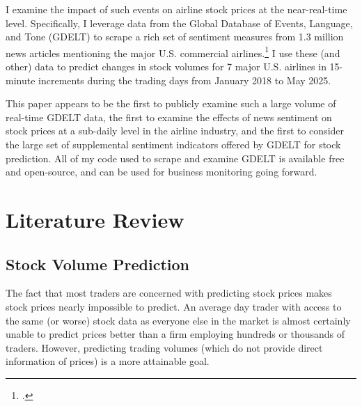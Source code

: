 \documentclass[12pt]{article}
\begin{document}
    I examine the impact of such events on airline stock prices at the near-real-time level. Specifically, I leverage data from the Global Database of Events, Language, and Tone (GDELT) to scrape a rich set of sentiment measures from 1.3 million news articles mentioning the major U.S. commercial airlines.\footnote{\textcite{leetaru2013gdelt}.} I use these (and other) data to predict changes in stock volumes for 7 major U.S. airlines in 15-minute increments during the trading days from January 2018 to May 2025.

    This paper appears to be the first to publicly examine such a large volume of real-time GDELT data, the first to examine the effects of news sentiment on stock prices at a sub-daily level in the airline industry, and the first to consider the large set of supplemental sentiment indicators offered by GDELT for stock prediction. All of my code used to scrape and examine GDELT is available free and open-source, and can be used for business monitoring going forward.

\section{Literature Review}

\subsection{Stock Volume Prediction}
The fact that most traders are concerned with predicting stock prices makes stock prices nearly impossible to predict. An average day trader with access to the same (or worse) stock data as everyone else in the market is almost certainly unable to predict prices better than a firm employing hundreds or thousands of traders. However, predicting trading volumes (which do not provide direct information of prices) is a more attainable goal.
\end{document}
